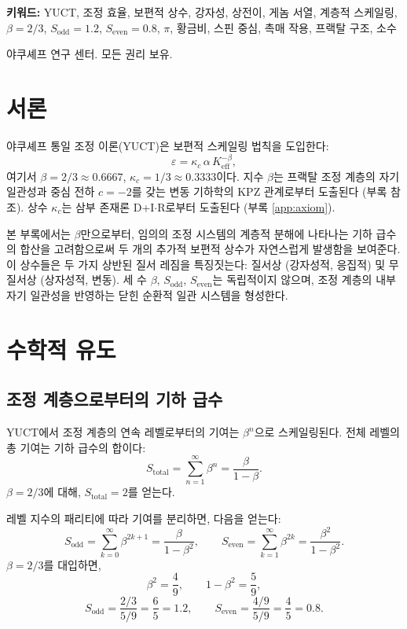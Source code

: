 \documentclass[11pt,a4paper]{article}
\begin{document}
\begin{titlepage}
\begin{center}
			\vspace{0.5cm}
			\noindent
			\footnotesize\textbf{키워드:} YUCT, 조정 효율, 보편적 상수, 강자성, 상전이, 게놈 서열, 계층적 스케일링, \(\beta = 2/3\), \(S_{\text{odd}} = 1.2\), \(S_{\text{even}} = 0.8\), \(\pi\), 황금비, 스핀 중심, 촉매 작용, 프랙탈 구조, 소수
			
			\vspace{0.3cm}
			\noindent
			\footnotesize{} 야쿠셰프 연구 센터. 모든 권리 보유.
		\end{center}
	\end{titlepage}
	
	\tableofcontents
	\newpage
	
	\section{서론}
	야쿠셰프 통일 조정 이론(YUCT)은 보편적 스케일링 법칙을 도입한다:
	\[
	\varepsilon = \kappa_c \, \alpha \, K_{\mathrm{eff}}^{-\beta},
	\]
	여기서 \(\beta = 2/3 \approx 0.6667\), \(\kappa_c = 1/3 \approx 0.3333\)이다. 지수 \(\beta\)는 프랙탈 조정 계층의 자기 일관성과 중심 전하 \(c = -2\)를 갖는 변동 기하학의 KPZ 관계로부터 도출된다 (부록 \cite{AppendixL, AppendixY} 참조). 상수 \(\kappa_c\)는 삼부 존재론 D+I\(\cdot\)R로부터 도출된다 (부록 \ref{app:axiom}).
	
	본 부록에서는 \(\beta\)만으로부터, 임의의 조정 시스템의 계층적 분해에 나타나는 기하 급수의 합산을 고려함으로써 두 개의 추가적 보편적 상수가 자연스럽게 발생함을 보여준다. 이 상수들은 두 가지 상반된 질서 레짐을 특징짓는다: 질서상 (강자성적, 응집적) 및 무질서상 (상자성적, 변동). 세 수 \(\beta\), \(S_{\text{odd}}\), \(S_{\text{even}}\)는 독립적이지 않으며, 조정 계층의 내부 자기 일관성을 반영하는 닫힌 순환적 일관 시스템을 형성한다.
	
	\section{수학적 유도}
	
	\subsection{조정 계층으로부터의 기하 급수}
	YUCT에서 조정 계층의 연속 레벨로부터의 기여는 \(\beta^n\)으로 스케일링된다. 전체 레벨의 총 기여는 기하 급수의 합이다:
	\[
	S_{\text{total}} = \sum_{n=1}^{\infty} \beta^n = \frac{\beta}{1-\beta}.
	\]
	\(\beta = 2/3\)에 대해, \(S_{\text{total}} = 2\)를 얻는다.
	
	레벨 지수의 패리티에 따라 기여를 분리하면, 다음을 얻는다:
	\[
	S_{\text{odd}} = \sum_{k=0}^{\infty} \beta^{2k+1} = \frac{\beta}{1-\beta^2},
	\qquad
	S_{\text{even}} = \sum_{k=1}^{\infty} \beta^{2k} = \frac{\beta^2}{1-\beta^2}.
	\]
	\(\beta = 2/3\)를 대입하면,
	\[
	\beta^2 = \frac{4}{9},\qquad 1-\beta^2 = \frac{5}{9},
	\]
	\[
	S_{\text{odd}} = \frac{2/3}{5/9} = \frac{6}{5}=1.2,\qquad
	S_{\text{even}} = \frac{4/9}{5/9} = \frac{4}{5}=0.8.
	\]
	
\end{document}
